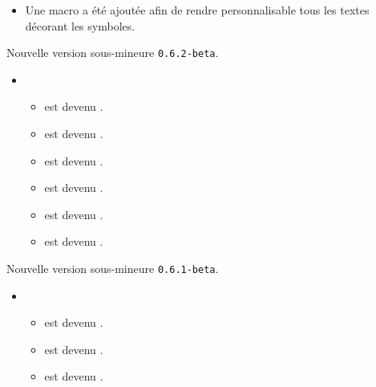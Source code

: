 \documentclass[12pt,a4paper]{book}
\begin{document}
\begin{description}
\begin{itemize}[itemsep=.5em]
\begin{itemize}[itemsep=.5em]
        \item Une macro  a été ajoutée afin de rendre personnalisable tous les textes décorant les symboles.
    \end{itemize}
\end{itemize}

\end{description}\begin{description}
\medskip
\item[2019-10-14] Nouvelle version sous-mineure \verb+0.6.2-beta+.

\begin{itemize}[itemsep=.5em]
    \item {}
    \begin{itemize}[itemsep=.5em]
        \item {} est devenu .

        \item {} est devenu .

        \item {} est devenu .

        \item {} est devenu .

        \item {} est devenu .

        \item {} est devenu .
    \end{itemize}
\end{itemize}

\end{description}\begin{description}
\medskip
\item[2019-10-13] Nouvelle version sous-mineure \verb+0.6.1-beta+.

\begin{itemize}[itemsep=.5em]
    \item {}
    \begin{itemize}[itemsep=.5em]
        \item {} est devenu .

        \item {} est devenu .

        \item {} est devenu .


\end{itemize}
\end{itemize}
\end{description}
\end{document}
